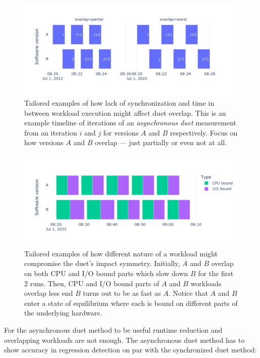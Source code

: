 \begin{figure}
	\centering
	\includegraphics[width=.9\linewidth]{./figures/overlap_timeline.pdf}
	\caption{
		Tailored examples of how lack of synchronization and time in between workload execution might affect duet overlap.
		This is an example timeline of iterations of an \emph{asynchronous duet} measurement from an iteration $i$ and $j$ for versions $A$ and $B$ respectively.
		Focus on how versions $A$ and $B$ overlap --- just partially or even not at all.
	}
	\label{fig:overlap_timeline}
\end{figure}

\begin{figure}
	\centering
	\includegraphics[width=.9\linewidth]{./figures/overlap_interference.pdf}
	\caption{
		Tailored examples of how different nature of a workload might compromise the duet's impact symmetry.
		Initially, $A$ and $B$ overlap on both CPU and I/O bound parts which slow down $B$ for the first 2 runs.
		Then, CPU and I/O bound parts of $A$ and $B$ workloads overlap less end $B$ turns out to be as fast as $A$.
		Notice that $A$ and $B$ enter a state of equilibrium where each is bound on different parts of the underlying hardware.
	}
	\label{fig:overlap_interference}
\end{figure}

For the asynchronous duet method to be useful runtime reduction and overlapping workloads are not enough.
The asynchronous duet method has to show accuracy in regression detection on par with the synchronized duet method:

